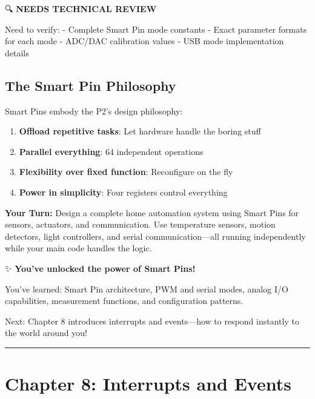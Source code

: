 \documentclass[11pt]{book}
\providecommand{\tightlist}{%
  \setlength{\itemsep}{0pt}\setlength{\parskip}{0pt}}
\begin{document}
\begin{review}
🔍 \textbf{NEEDS TECHNICAL REVIEW}

Need to verify:
- Complete Smart Pin mode constants
- Exact parameter formats for each mode
- ADC/DAC calibration values
- USB mode implementation details
\end{review}

\hypertarget{the-smart-pin-philosophy}{%
\subsection{The Smart Pin Philosophy}\label{the-smart-pin-philosophy}}

Smart Pins embody the P2's design philosophy:

\begin{enumerate}
\def\labelenumi{\arabic{enumi}.}
\tightlist
\item
  \textbf{Offload repetitive tasks}: Let hardware handle the boring
  stuff
\item
  \textbf{Parallel everything}: 64 independent operations
\item
  \textbf{Flexibility over fixed function}: Reconfigure on the fly
\item
  \textbf{Power in simplicity}: Four registers control everything
\end{enumerate}

\textbf{Your Turn:} Design a complete home automation system using Smart
Pins for sensors, actuators, and communication. Use temperature sensors,
motion detectors, light controllers, and serial communication---all
running independently while your main code handles the logic.

\begin{chapterend}
✨ \textbf{You've unlocked the power of Smart Pins!}

You've learned: Smart Pin architecture, PWM and serial modes, analog I/O capabilities, measurement functions, and configuration patterns.

Next: Chapter 8 introduces interrupts and events—how to respond instantly to the world around you!
\end{chapterend}

\begin{center}\rule{0.5\linewidth}{0.5pt}\end{center}

\hypertarget{chapter-8-interrupts-and-events}{%
\section{Chapter 8: Interrupts and
Events}\label{chapter-8-interrupts-and-events}}
\end{document}
